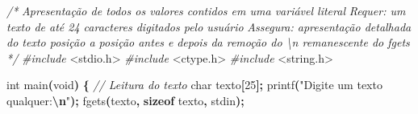 \documentclass[
  11pt,
  a4paper,
]{scrbook}
\newenvironment{Shaded}{\begin{snugshade}}{\end{snugshade}}
\newcommand{\CommentTok}[1]{\textcolor[rgb]{0.56,0.35,0.01}{\textit{#1}}}
\newcommand{\DataTypeTok}[1]{\textcolor[rgb]{0.13,0.29,0.53}{#1}}
\newcommand{\DecValTok}[1]{\textcolor[rgb]{0.00,0.00,0.81}{#1}}
\newcommand{\ImportTok}[1]{#1}
\newcommand{\KeywordTok}[1]{\textcolor[rgb]{0.13,0.29,0.53}{\textbf{#1}}}
\newcommand{\NormalTok}[1]{#1}
\newcommand{\OperatorTok}[1]{\textcolor[rgb]{0.81,0.36,0.00}{\textbf{#1}}}
\newcommand{\PreprocessorTok}[1]{\textcolor[rgb]{0.56,0.35,0.01}{\textit{#1}}}
\newcommand{\SpecialCharTok}[1]{\textcolor[rgb]{0.81,0.36,0.00}{\textbf{#1}}}
\newcommand{\StringTok}[1]{\textcolor[rgb]{0.31,0.60,0.02}{#1}}
\begin{document}
\begin{Shaded}
\begin{Highlighting}[]
\CommentTok{/*}
\CommentTok{Apresentação de todos os valores contidos em uma variável literal}
\CommentTok{Requer: um texto de até 24 caracteres digitados pelo usuário}
\CommentTok{Assegura: apresentação detalhada do texto posição a posição antes e}
\CommentTok{    depois da remoção do \textbackslash{}n remanescente do fgets}
\CommentTok{*/}
\PreprocessorTok{\#include }\ImportTok{\textless{}stdio.h\textgreater{}}
\PreprocessorTok{\#include }\ImportTok{\textless{}ctype.h\textgreater{}}
\PreprocessorTok{\#include }\ImportTok{\textless{}string.h\textgreater{}}

\DataTypeTok{int}\NormalTok{ main}\OperatorTok{(}\DataTypeTok{void}\OperatorTok{)} \OperatorTok{\{}
    \CommentTok{// Leitura do texto}
    \DataTypeTok{char}\NormalTok{ texto}\OperatorTok{[}\DecValTok{25}\OperatorTok{];}
\NormalTok{    printf}\OperatorTok{(}\StringTok{"Digite um texto qualquer:}\SpecialCharTok{\textbackslash{}n}\StringTok{"}\OperatorTok{);}
\NormalTok{    fgets}\OperatorTok{(}\NormalTok{texto}\OperatorTok{,} \KeywordTok{sizeof}\NormalTok{ texto}\OperatorTok{,}\NormalTok{ stdin}\OperatorTok{);}


\end{Highlighting}
\end{Shaded}
\end{document}
